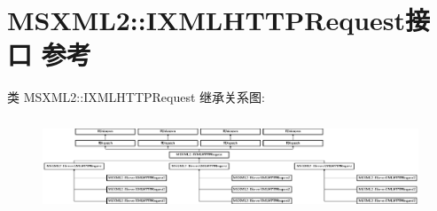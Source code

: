 \hypertarget{interface_m_s_x_m_l2_1_1_i_x_m_l_h_t_t_p_request}{}\section{M\+S\+X\+M\+L2\+:\+:I\+X\+M\+L\+H\+T\+T\+P\+Request接口 参考}
\label{interface_m_s_x_m_l2_1_1_i_x_m_l_h_t_t_p_request}
类 M\+S\+X\+M\+L2\+:\+:I\+X\+M\+L\+H\+T\+T\+P\+Request 继承关系图\+:\begin{figure}[H]
\begin{center}
\leavevmode
\includegraphics[height=2.840580cm]{interface_m_s_x_m_l2_1_1_i_x_m_l_h_t_t_p_request}
\end{center}
\end{figure}
